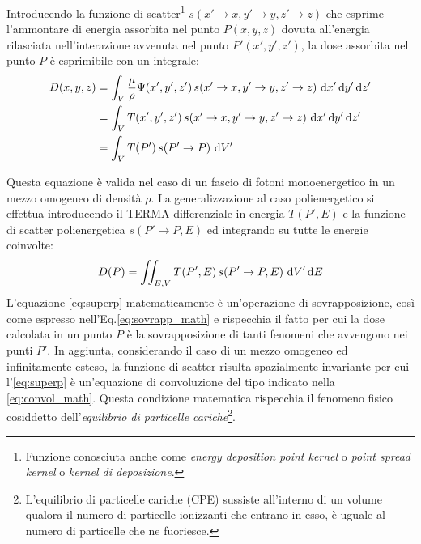 {Introducendo la funzione di scatter\footnote{Funzione conosciuta anche come \textit{energy deposition point kernel} o \textit{point spread kernel} o \textit{kernel di deposizione}.} $s(x'\rightarrow x, y'\rightarrow y, z'\rightarrow z)$ che esprime l'ammontare di energia assorbita nel punto $P(x,y,z)$ dovuta all'energia rilasciata nell'interazione avvenuta nel punto $P'(x',y',z')$, la dose assorbita nel punto $P$ è esprimibile con un integrale:
\begin{align}
D(x,y,z) &=  \int_V \frac{\mu}{\rho} \Psi(x',y',z')\,s(x'\rightarrow x, y'\rightarrow y, z'\rightarrow z)\, \,\text{d} x' \,\text{d} y' \,\text{d} z'\\
         &= \int_V T(x',y',z')\,s(x'\rightarrow x, y'\rightarrow y, z'\rightarrow z)\, \,\text{d} x' \,\text{d} y' \,\text{d} z'\\
         &= \int_V T(P')\,s(P'\rightarrow P)\, \,\text{d} V'
\end{align}

Questa equazione è valida nel caso di un fascio di fotoni monoenergetico in un mezzo omogeneo di densità $\rho$. La generalizzazione al caso polienergetico si effettua introducendo il TERMA differenziale in energia $T(P',E)$ e la funzione di scatter polienergetica $s(P'\rightarrow P,E)$ ed integrando su tutte le energie coinvolte:
\begin{equation}
D(P) = \iint_{E,V} T(P',E)\,s(P'\rightarrow P,E)\, \,\text{d} V' \,\text{d} E
\label{eq:superp}
\end{equation}
L'equazione \eqref{eq:superp} matematicamente è un'operazione di sovrapposizione, così come espresso nell'Eq.\eqref{eq:sovrapp_math} e rispecchia il fatto per cui la dose calcolata in un punto $P$ è la sovrapposizione di tanti fenomeni che avvengono nei punti $P'$. In aggiunta, considerando il caso di un mezzo omogeneo ed infinitamente esteso, la funzione di scatter risulta spazialmente invariante per cui l'\eqref{eq:superp} è un'equazione di convoluzione del tipo indicato nella \eqref{eq:convol_math}. Questa condizione matematica rispecchia il fenomeno fisico cosiddetto dell'\textit{equilibrio di particelle cariche}\footnote{L'equilibrio di particelle cariche (CPE) sussiste all'interno di un volume qualora il numero di particelle ionizzanti che entrano in esso, è uguale al numero di particelle che ne fuoriesce.}.




}
